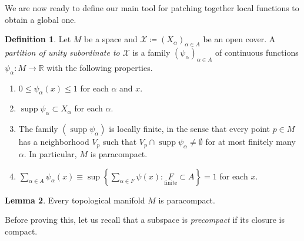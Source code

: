 \documentclass[10pt,letterpaper,cm]{nupset}
\theoremstyle{definition}
\newtheorem{definition}{Definition}[subsection]
\theoremstyle{theorem}
\newtheorem{lemma}[definition]{Lemma}
\theoremstyle{remark}
\newcommand{\R}{\mathbb R}
\newcommand{\1}{\mathbf{1}}
\newcommand{\0}{\vec 0}
\DeclareMathOperator{\supp}{supp}
\begin{document}
\smallskip

We are now ready to define our main tool for patching together local functions to obtain a global one.

\begin{definition} Let $M$ be a space and $\mathcal{X}\coloneqq \left(X_\alpha\right)_{\alpha \in A}$ be an open cover. A \textit{partition of unity subordinate to $\mathcal{X}$} is a family $\left(\psi_\alpha\right)_{\alpha \in A}$ of continuous functions $\psi_\alpha : M \to \R$ with the following properties.
\begin{enumerate}[label=(\alph*)]
\item $0\leq \psi_\alpha(x) \leq 1$ for each $\alpha$ and $x$.
\item $\supp \psi_\alpha \subset X_\alpha$ for each $\alpha$.
\item The family $\left(\supp \psi_\alpha\right)$ is locally finite, in the sense that every point $p\in M$ has a neighborhood $V_p$ such that $V_p \cap \supp \psi_\alpha \ne \emptyset$ for at most finitely many $\alpha$. In particular, $M$ is paracompact.
\item $\sum_{\alpha \in A} \psi_\alpha(x) \equiv \sup\left\{\sum_{\alpha \in F}\psi(x) : \underset{\text{finite}} F \subset A\right\} = 1$ for each $x$.
\end{enumerate}
\end{definition}  

\begin{lemma}
Every topological manifold $M$ is paracompact. 
\end{lemma}

Before proving this, let us recall that a subspace is \textit{precompact} if its closure is compact.
\end{document}

